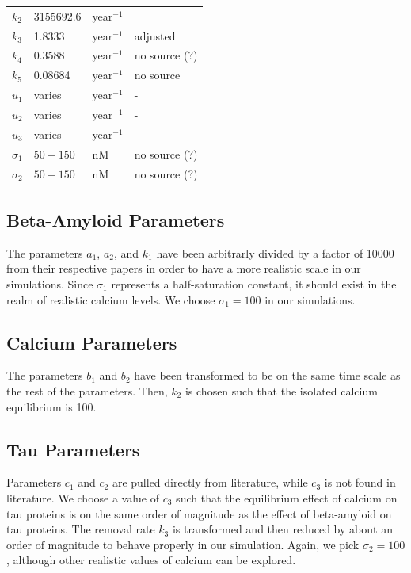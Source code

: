 \documentclass[12pt]{article}
\theoremstyle{definition}
\begin{document}
\begin{table}[h]
\begin{tabular}{|l|l|l|l|}
        $k _{2}$ & 3155692.6 & year$^{-1}$ & \cite{zhang2020mathematical} \\
        $k _{3}$ & 1.8333 & year$^{-1}$ & \cite{maji2026quantifying} adjusted \\
        $k _{4}$ & 0.3588 & year$^{-1}$ & no source (?) \\
        $k _{5}$ & 0.08684 & year$^{-1}$ & no source \\
        $u _{1}$ & varies & year$^{-1}$ & - \\
        $u _{2}$ & varies & year$^{-1}$ & - \\
        $u _{3}$ & varies & year$^{-1}$ & - \\
        $\sigma_1$ & $50-150$ & nM & no source (?) \\
        $\sigma_2$ & $50-150$ & nM & no source (?) \\
        \hline
    \end{tabular}
\end{table} \bigskip

\subsection{Beta-Amyloid Parameters}
The parameters $a_1$, $a_2$, and $k_1$ have been arbitrarly divided by a factor of 10000 from their respective papers in order to have a more realistic scale in our simulations. Since $\sigma_1$ represents a half-saturation constant, it should exist in the realm of realistic calcium levels. We choose $\sigma_1 = 100$ in our simulations. \bigskip

\subsection{Calcium Parameters}
The parameters $b_1$ and $b_2$ have been transformed to be on the same time scale as the rest of the parameters. Then, $k_2$ is chosen such that the isolated calcium equilibrium is 100. \bigskip

\subsection{Tau Parameters}
Parameters $c_1$ and $c_2$ are pulled directly from literature, while $c_3$ is not found in literature. We choose a value of $c_3$ such that the equilibrium effect of calcium on tau proteins is on the same order of magnitude as the effect of beta-amyloid on tau proteins. The removal rate $k_3$ is transformed and then reduced by about an order of magnitude to behave properly in our simulation. Again, we pick $\sigma_2 = 100$, although other realistic values of calcium can be explored. \bigskip
\end{document}
